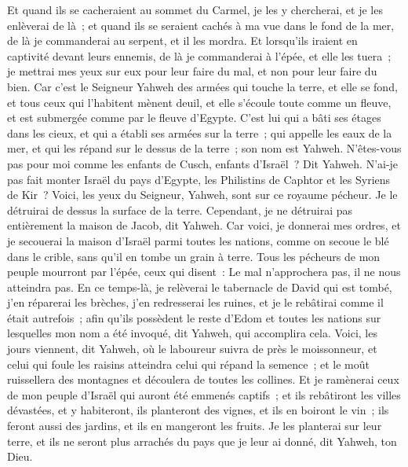 \begin{multicols}{2}
Et quand ils se cacheraient au sommet du Carmel, je les y chercherai, et je les enlèverai de là~; et quand ils se seraient cachés à ma vue dans le fond de la mer, de là je commanderai au serpent, et il les mordra.
Et lorsqu'ils iraient en captivité devant leurs ennemis, de là je commanderai à l'épée, et elle les tuera~; je mettrai mes yeux sur eux pour leur faire du mal, et non pour leur faire du bien.
Car c'est le Seigneur Yahweh des armées qui touche la terre, et elle se fond, et tous ceux qui l'habitent mènent deuil, et elle s'écoule toute comme un fleuve, et est submergée comme par le fleuve d'Egypte. 
C'est lui qui a bâti ses étages dans les cieux, et qui a établi ses armées sur la terre~; qui appelle les eaux de la mer, et qui les répand sur le dessus de la terre~; son nom est Yahweh. 
N'êtes-vous pas pour moi comme les enfants de Cusch, enfants d'Israël~? Dit Yahweh. N'ai-je pas fait monter Israël du pays d'Egypte, les Philistins de Caphtor et les Syriens de Kir~?
Voici, les yeux du Seigneur, Yahweh, sont sur ce royaume pécheur. Je le détruirai de dessus la surface de la terre. Cependant, je ne détruirai pas entièrement la maison de Jacob, dit Yahweh.
Car voici, je donnerai mes ordres, et je secouerai la maison d'Israël parmi toutes les nations, comme on secoue le blé dans le crible, sans qu'il en tombe un grain à terre.
Tous les pécheurs de mon peuple mourront par l'épée, ceux qui disent~: Le mal n'approchera pas, il ne nous atteindra pas.
En ce temps-là, je relèverai le tabernacle de David qui est tombé, j'en réparerai les brèches, j'en redresserai les ruines, et je le rebâtirai comme il était autrefois~;
afin qu'ils possèdent le reste d'Edom et toutes les nations sur lesquelles mon nom a été invoqué, dit Yahweh, qui accomplira cela.
Voici, les jours viennent, dit Yahweh, où le laboureur suivra de près le moissonneur, et celui qui foule les raisins atteindra celui qui répand la semence~; et le moût ruissellera des montagnes et découlera de toutes les collines.
Et je ramènerai ceux de mon peuple d'Israël qui auront été emmenés captifs~; et ils rebâtiront les villes dévastées, et y habiteront, ils planteront des vignes, et ils en boiront le vin~; ils feront aussi des jardins, et ils en mangeront les fruits.
Je les planterai sur leur terre, et ils ne seront plus arrachés du pays que je leur ai donné, dit Yahweh, ton Dieu.
\PPE{}
\end{multicols}
